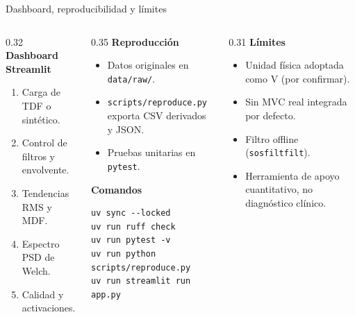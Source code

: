 \documentclass[10pt, aspectratio=169]{beamer}
\begin{document}
\begin{frame}[fragile]{Dashboard, reproducibilidad y límites}
\fontsize{8.5pt}{10.5pt}\selectfont
\begin{columns}[t]
    \begin{column}{0.32\textwidth}
        \textbf{Dashboard Streamlit}
        \begin{enumerate}
            \item Carga de TDF o sintético.
            \item Control de filtros y envolvente.
            \item Tendencias RMS y MDF.
            \item Espectro PSD de Welch.
            \item Calidad y activaciones.
        \end{enumerate}
    \end{column}
    
    \begin{column}{0.35\textwidth}
        \textbf{Reproducción}
        \begin{itemize}
            \item Datos originales en \texttt{data/raw/}.
            \item \texttt{scripts/reproduce.py} exporta CSV derivados y JSON.
            \item Pruebas unitarias en \texttt{pytest}.
        \end{itemize}
        
        \vspace{0.1cm}
        \textbf{Comandos}
        \begin{tiny}
\begin{verbatim}
uv sync --locked
uv run ruff check
uv run pytest -v
uv run python scripts/reproduce.py
uv run streamlit run app.py
\end{verbatim}
        \end{tiny}
    \end{column}
    
    \begin{column}{0.31\textwidth}
        \textbf{Límites}
        \begin{itemize}
            \item Unidad física adoptada como V (por confirmar).
            \item Sin MVC real integrada por defecto.
            \item Filtro offline (\texttt{sosfiltfilt}).
            \item Herramienta de apoyo cuantitativo, no diagnóstico clínico.
        \end{itemize}
    \end{column}
\end{columns}
\end{frame}
\end{document}
